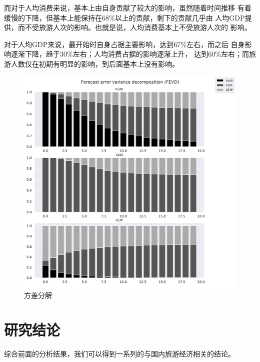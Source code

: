 \documentclass{article}
\begin{document}
    而对于人均消费来说，基本上由自身贡献了较大的影响，虽然随着时间推移
    有着缓慢的下降，但基本上能保持在68\%以上的贡献，剩下的贡献几乎由
    人均GDP提供，而不受旅游人次的影响。也就是说，人均消费基本上不受旅游人次的
    影响。

    对于人均GDP来说，最开始时自身占据主要影响，达到67\%左右，而之后
    自身影响逐渐下降，趋于30\%左右；人均消费占据的影响逐渐上升，
    达到60\%左右；而旅游人数仅在初期有明显的影响，到后面基本上没有影响。

    \begin{figure}[h]
        \includegraphics[width=\textwidth]{FEVD}
        \caption{方差分解}
        \label{fig:fevd}
    \end{figure}
    
    \section{研究结论}
    综合前面的分析结果，我们可以得到一系列的与国内旅游经济相关的结论。
\end{document}
